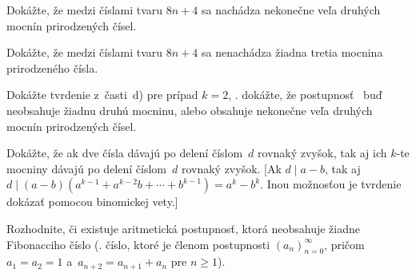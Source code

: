 {
Dokážte, že medzi číslami tvaru $8n+4$ sa nachádza nekonečne veľa druhých mocnín prirodzených čísel.

Dokážte, že medzi číslami tvaru $8n+4$ sa nenachádza žiadna tretia mocnina prirodzeného čísla.

Dokážte tvrdenie z~časti~d) pre prípad $k=2$, \tj. dokážte, že postupnosť~\thetag{$\ast$} buď neobsahuje žiadnu druhú mocninu, alebo obsahuje nekonečne veľa druhých mocnín prirodzených čísel.

Dokážte, že ak dve čísla dávajú po delení číslom~$d$ rovnaký zvyšok, tak aj ich $k$-te mocniny dávajú po delení číslom~$d$ rovnaký zvyšok. [Ak $d\mid a-b$, tak aj $d\mid (a-b)(a^{k-1}+a^{k-2}b+\cdots+b^{k-1})=a^k-b^k$. Inou možnosťou je tvrdenie dokázať pomocou binomickej vety.]

\D
Rozhodnite, či existuje aritmetická postupnosť, ktorá neobsahuje žiadne Fibonacciho číslo (\tj. číslo, ktoré je členom postupnosti $(a_n)_{n=0}^\infty$, pričom $a_1=a_2=1$ a~$a_{n+2}=a_{n+1}+a_n$ pre $n\ge1$).
}

